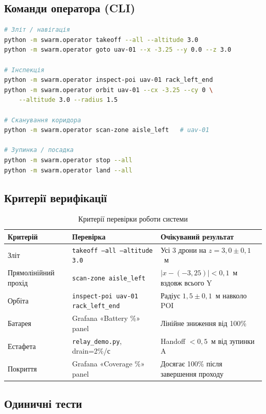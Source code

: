 \subsection{Команди оператора (CLI)}

\begin{lstlisting}[language=bash, caption={Команди оператора}]
# Зліт / навігація
python -m swarm.operator takeoff --all --altitude 3.0
python -m swarm.operator goto uav-01 --x -3.25 --y 0.0 --z 3.0

# Інспекція
python -m swarm.operator inspect-poi uav-01 rack_left_end
python -m swarm.operator orbit uav-01 --cx -3.25 --cy 0 \
    --altitude 3.0 --radius 1.5

# Сканування коридора
python -m swarm.operator scan-zone aisle_left   # uav-01

# Зупинка / посадка
python -m swarm.operator stop --all
python -m swarm.operator land --all
\end{lstlisting}

\subsection{Критерії верифікації}

\begin{table}[h]
  \centering
  \caption{Критерії перевірки роботи системи}
  \begin{tabularx}{\linewidth}{lXl}
    \toprule
    Критерій & Перевірка & Очікуваний результат \\
    \midrule
    Зліт & \texttt{takeoff --all --altitude 3.0} & Усі 3 дрони на $z=3{,}0\pm0{,}1$~м \\
    Прямолінійний прохід & \texttt{scan-zone aisle\_left} & $|x - (-3{,}25)| < 0{,}1$~м вздовж всього Y \\
    Орбіта & \texttt{inspect-poi uav-01 rack\_left\_end} & Радіус $1{,}5\pm0{,}1$~м навколо POI \\
    Батарея & Grafana «Battery \%» panel & Лінійне зниження від 100\% \\
    Естафета & \texttt{relay\_demo.py}, drain=2\%/с & Handoff $< 0{,}5$~м від зупинки A \\
    Покриття & Grafana «Coverage \%» panel & Досягає 100\% після завершення проходу \\
    \bottomrule
  \end{tabularx}
  \label{tab:criteria}
\end{table}

\subsection{Одиничні тести}

